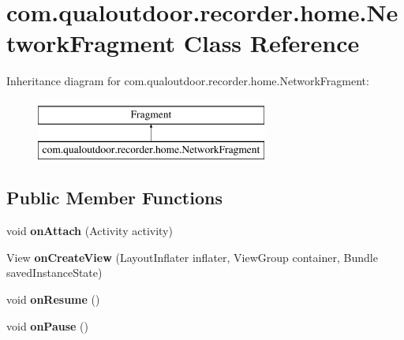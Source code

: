 \hypertarget{classcom_1_1qualoutdoor_1_1recorder_1_1home_1_1NetworkFragment}{\section{com.\-qualoutdoor.\-recorder.\-home.\-Network\-Fragment Class Reference}
\label{classcom_1_1qualoutdoor_1_1recorder_1_1home_1_1NetworkFragment}
}
Inheritance diagram for com.\-qualoutdoor.\-recorder.\-home.\-Network\-Fragment\-:\begin{figure}[H]
\begin{center}
\leavevmode
\includegraphics[height=2.000000cm]{classcom_1_1qualoutdoor_1_1recorder_1_1home_1_1NetworkFragment}
\end{center}
\end{figure}
\subsection*{Public Member Functions}
\begin{DoxyCompactItemize}
\item 
\hypertarget{classcom_1_1qualoutdoor_1_1recorder_1_1home_1_1NetworkFragment_ad06feeba4c3cfb776f5dd72bc873eaee}{void {\bfseries on\-Attach} (Activity activity)}\label{classcom_1_1qualoutdoor_1_1recorder_1_1home_1_1NetworkFragment_ad06feeba4c3cfb776f5dd72bc873eaee}

\item 
\hypertarget{classcom_1_1qualoutdoor_1_1recorder_1_1home_1_1NetworkFragment_af3a7661c8d09c4283112f73fce29806f}{View {\bfseries on\-Create\-View} (Layout\-Inflater inflater, View\-Group container, Bundle saved\-Instance\-State)}\label{classcom_1_1qualoutdoor_1_1recorder_1_1home_1_1NetworkFragment_af3a7661c8d09c4283112f73fce29806f}

\item 
\hypertarget{classcom_1_1qualoutdoor_1_1recorder_1_1home_1_1NetworkFragment_af02e38f487205db80fa70e5134455543}{void {\bfseries on\-Resume} ()}\label{classcom_1_1qualoutdoor_1_1recorder_1_1home_1_1NetworkFragment_af02e38f487205db80fa70e5134455543}

\item 
\hypertarget{classcom_1_1qualoutdoor_1_1recorder_1_1home_1_1NetworkFragment_ad1dfea32cd27cbbf104b955025ef2acd}{void {\bfseries on\-Pause} ()}\label{classcom_1_1qualoutdoor_1_1recorder_1_1home_1_1NetworkFragment_ad1dfea32cd27cbbf104b955025ef2acd}

\end{DoxyCompactItemize}

